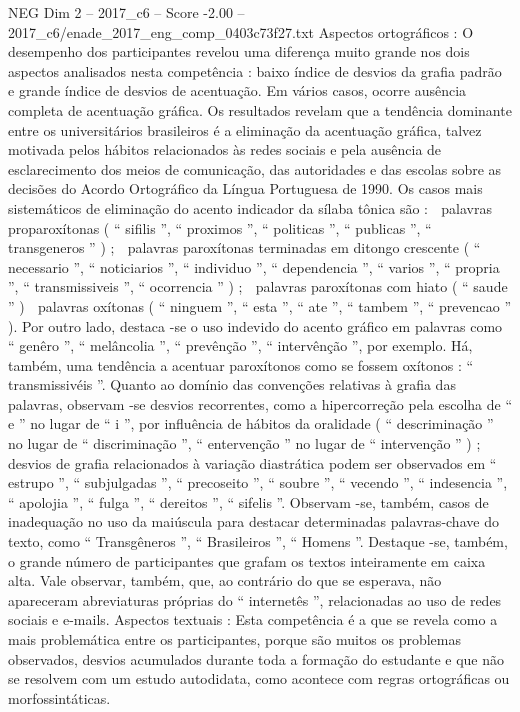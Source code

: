 \begin{textsample}{NEG Dim 2 – 2017\_c6 – Score -2.00 – 2017\_c6/enade\_2017\_eng\_comp\_0403c73f27.txt}
Aspectos ortográficos : O desempenho dos participantes revelou uma diferença muito grande nos dois aspectos analisados nesta competência : baixo índice de desvios da grafia padrão e grande índice de desvios de acentuação.
Em vários casos, ocorre ausência completa de acentuação gráfica.
Os resultados revelam que a tendência dominante entre os universitários brasileiros é a eliminação da acentuação gráfica, talvez motivada pelos hábitos relacionados às redes sociais e pela ausência de esclarecimento dos meios de comunicação, das autoridades e das escolas sobre as decisões do Acordo Ortográfico da Língua Portuguesa de 1990.
Os casos mais sistemáticos de eliminação do acento indicador da sílaba tônica são :  palavras proparoxítonas ( “ sifilis ”, “ proximos ”, “ politicas ”, “ publicas ”, “ transgeneros ” ) ;  palavras paroxítonas terminadas em ditongo crescente ( “ necessario ”, “ noticiarios ”, “ individuo ”, “ dependencia ”, “ varios ”, “ propria ”, “ transmissiveis ”, “ ocorrencia ” ) ;  palavras paroxítonas com hiato ( “ saude ” )  palavras oxítonas ( “ ninguem ”, “ esta ”, “ ate ”, “ tambem ”, “ prevencao ” ).
Por outro lado, destaca -se o uso indevido do acento gráfico em palavras como “ genêro ”, “ melâncolia ”, “ prevênção ”, “ intervênção ”, por exemplo.
Há, também, uma tendência a acentuar paroxítonos como se fossem oxítonos : “ transmissivéis ”.
Quanto ao domínio das convenções relativas à grafia das palavras, observam -se desvios recorrentes, como a hipercorreção pela escolha de “ e ” no lugar de “ i ”, por influência de hábitos da oralidade ( “ descriminação ” no lugar de “ discriminação ”, “ entervenção ” no lugar de “ intervenção ” ) ; desvios de grafia relacionados à variação diastrática podem ser observados em “ estrupo ”, “ subjulgadas ”, “ precoseito ”, “ soubre ”, “ vecendo ”, “ indesencia ”, “ apolojia ”, “ fulga ”, “ dereitos ”, “ sifelis ”.
Observam -se, também, casos de inadequação no uso da maiúscula para destacar determinadas palavras-chave do texto, como “ Transgêneros ”, “ Brasileiros ”, “ Homens ”.
Destaque -se, também, o grande número de participantes que grafam os textos inteiramente em caixa alta.
Vale observar, também, que, ao contrário do que se esperava, não apareceram abreviaturas próprias do “ internetês ”, relacionadas ao uso de redes sociais e e-mails.
Aspectos textuais : Esta competência é a que se revela como a mais problemática entre os participantes, porque são muitos os problemas observados, desvios acumulados durante toda a formação do estudante e que não se resolvem com um estudo autodidata, como acontece com regras ortográficas ou morfossintáticas.

\end{textsample}
